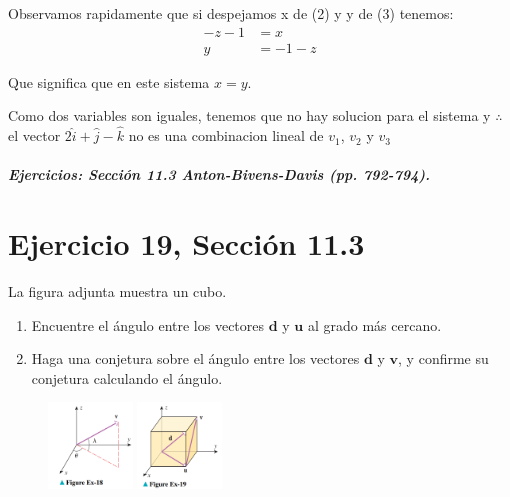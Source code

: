 \documentclass[11pt,letterpaper]{article}
\begin{document}
Observamos rapidamente que si despejamos x de (2) y y de (3) tenemos:
\begin{equation*}
    \begin{split}
        -z-1&=x\\
        y&=-1-z
    \end{split}
\end{equation*}

Que significa que en este sistema $x=y$.

Como dos variables son iguales, tenemos que no hay solucion para el sistema y $\therefore$ el vector $2\hat{i} + \hat{j} - \hat{k}$ no es una combinacion lineal de $v_1$, $v_2$ y $v_3$



\subparagraph{Ejercicios: Sección 11.3 Anton-Bivens-Davis (pp. 792-794).}

\section{Ejercicio 19, Sección 11.3}
La figura adjunta muestra un cubo.
\begin{enumerate}
    \item Encuentre el ángulo entre los vectores $\mathbf{d}$ y $\mathbf{u}$ al grado más cercano.
    \item Haga una conjetura sobre el ángulo entre los vectores $\mathbf{d}$ y $\mathbf{v}$, y confirme su conjetura calculando el ángulo.
\end{enumerate}

\begin{figure}[h]
    \centering
    \includegraphics[width=0.2\textwidth]{imagenes/Figure_Ex-18.png}
    \hspace{5cm}
    \includegraphics[width=0.2\textwidth]{imagenes/Figure_Ex-19.png}
\end{figure}
\end{document}
